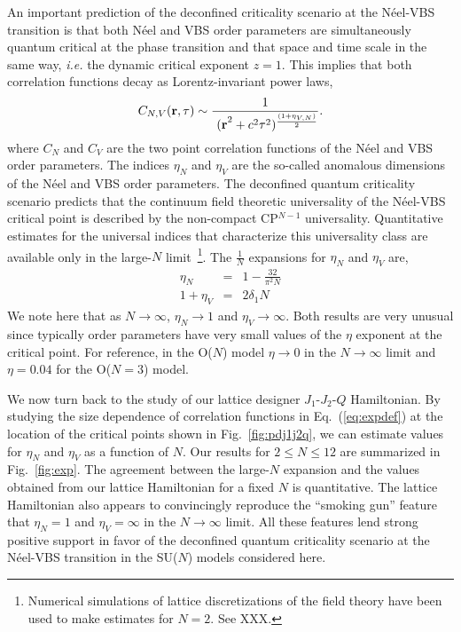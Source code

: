 \documentclass[aps,prb,groupedaddress,twocolumn]{revtex4}
\begin{document}
An important prediction of the deconfined criticality scenario at the
N\'eel-VBS transition is that both N\'eel and VBS order parameters are
simultaneously quantum critical at the phase transition and that space
and time scale in the same way, {\em i.e.} the dynamic critical exponent $z=1$. This implies
that both correlation functions decay as Lorentz-invariant power laws,
\begin{equation}
\label{eq:expdef}
C_{N,V} ({\bf r},\tau) \sim  \frac{1}{~{(\bf r}^2+c^2\tau^2)^{\frac{(1+\eta_{V,N})}{2}}}.
\end{equation}
 where $C_N$ and $C_V$ are the two point correlation functions of the
 N\'eel and VBS order parameters. The indices $\eta_N$ and $\eta_V$
 are the so-called anomalous dimensions of the N\'eel and VBS order
 parameters. The deconfined quantum criticality scenario predicts that
 the continuum field theoretic universality of the N\'eel-VBS critical
 point is described by the non-compact CP$^{N-1}$ universality. Quantitative
 estimates for the universal indices that characterize this
 universality class are available only in the large-$N$
 limit~\footnote{Numerical simulations of lattice discretizations of
   the field theory have been used to make estimates for $N=2$. See
   XXX.}. The $\frac{1}{N}$ expansions for $\eta_N$ and $\eta_V$ are,
\begin{eqnarray}
\label{eq:oneonN}
\eta_N &=& 1 - \frac{32}{\pi^2N}\nonumber\\
1+\eta_V &=& 2 \delta_1 N
\end{eqnarray}
We note here that as $N\rightarrow\infty$, $\eta_N \rightarrow 1$ and
$\eta_V\rightarrow \infty$. Both results are very unusual since
typically order parameters have very small values of the $\eta$
exponent at the critical point. For reference, in the O($N$) model $\eta\rightarrow
0$ in the $N\rightarrow\infty$ limit and $\eta=0.04$ for the O($N=3$) model.

We now turn back to the study of our lattice designer $J_1$-$J_2$-$Q$
Hamiltonian. By studying the size dependence of correlation functions in Eq.~(\ref{eq:expdef})
 at the location of the critical points shown in Fig.~\ref{fig:pdj1j2q}, we can
 estimate values for $\eta_N$ and $\eta_V$ as a function
 of $N$. Our results for $2\leq N \leq 12$ are summarized in Fig.~\ref{fig:exp}. The
 agreement between the large-$N$ expansion and the values obtained from our
 lattice Hamiltonian for a fixed $N$ is quantitative. The lattice
 Hamiltonian also appears to convincingly reproduce the ``smoking gun'' feature that
 $\eta_N=1$ and $\eta_V=\infty$ in the $N\rightarrow \infty$
 limit. All these features lend strong positive support in favor of
 the deconfined quantum criticality scenario at the N\'eel-VBS
 transition in the SU($N$) models considered here.
\end{document}
